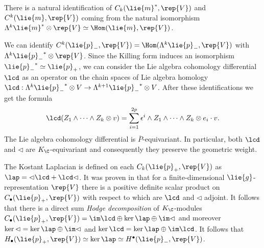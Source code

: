 There is a natural identification of $C_k(\lie{m}^*,\rep{V})$ and $C^k(\lie{m},\rep{V})$ coming from the natural isomorphism $\Lambda^k \lie{m}^* \otimes \rep{V} \simeq \Hom(\lie{m},\rep{V})$.

We can identify $C^k(\lie{p}_-,\rep{V})=\Hom (\Lambda^k\lie{p}_-,\rep{V})$ with $\Lambda^k {\lie{p}_-}^*\otimes\rep{V}$. Since the Killing form induces an isomorphism ${\lie{p}_-}^* \simeq \lie{p}_+$, we can consider the Lie algebra cohomology differential $\lcd$ as an operator on the chain spaces of Lie algebra homology $\lcd: \Lambda^k {\lie{p}_-}^* \otimes V \to \Lambda^{k+1}{\lie{p}_-}^*\otimes V$. After these identifications we get the formula
\[
 \lcd  (Z_1\wedge\cdots\wedge Z_k\otimes v) = \sum_{i=1}^{2p} \epsilon^i \wedge Z_1\wedge\cdots\wedge Z_k\otimes e_i\cdot v.
\] The Lie algebra cohomology differential is $\overline{P}$-equivariant. In particular, both $\lcd$ and $\lhd$ are $K_\C$-equivariant and consequently they preserve the geometric weight.

The Kostant Laplacian is defined on each $C_k(\lie{p}_+,\rep{V})$ as $\lap = \lhd \lcd + \lcd \lhd$. It was proven in \cite{kostant_lie_1961} that for a finite-dimensional $\lie{g}$-representation $\rep{V}$ there is a positive definite scalar product on $C_\bullet(\lie{p}_+,\rep{V})$ with respect to which are $\lcd$ and $\lhd$ adjoint. It follows that there is a direct sum \emph{Hodge decomposition} of $K_\C$-modules $C_\bullet(\lie{p}_+,\rep{V})=\im \lcd \oplus  \ker \lap \oplus \im \lhd$ and moreover $\ker \lhd = \ker \lap \oplus \im \lhd$ and $\ker \lcd = \ker \lap \oplus \im \lcd$. It follows that $H_\bullet(\lie{p}_+,\rep{V})\simeq \ker \lap \simeq H^\bullet(\lie{p}_-,\rep{V})$.


